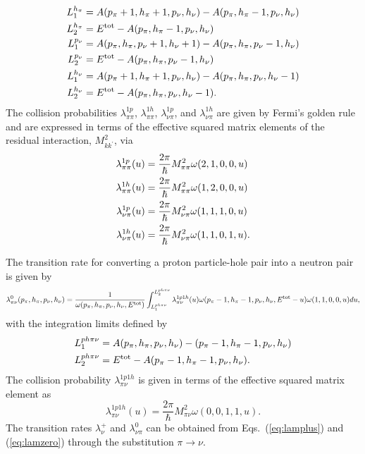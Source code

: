 \documentclass[
10pt,
showpacs,preprintnumbers,footinbib,
amsfonts,amsmath,amssymb,
aps,
prc,twocolumn,groupedaddress,superscriptaddress,
showkeys,
nofootinbib
]{revtex4-1}
\begin{document}
\begin{widetext}
\begin{align}
L_1^{h_\pi} & = A(p_\pi+1, h_\pi+1, p_\nu, h_\nu) - A(p_\pi, h_\pi-1, p_\nu, h_\nu) \notag \\
L_2^{h_\pi} & = E^{\rm tot}  - A(p_\pi, h_\pi-1, p_\nu, h_\nu) \notag \\
L_1^{p_\nu} & = A(p_\pi, h_\pi, p_\nu+1, h_\nu+1) - A(p_\pi, h_\pi, p_\nu-1, h_\nu) \notag \\
L_2^{p_\nu} & = E^{\rm tot}  - A(p_\pi, h_\pi, p_\nu-1, h_\nu) \notag\\
L_1^{h_\nu} & = A(p_\pi+1, h_\pi+1, p_\nu, h_\nu) - A(p_\pi, h_\pi, p_\nu, h_\nu-1) \notag \\
L_2^{h_\nu} & = E^{\rm tot}  - A(p_\pi, h_\pi, p_\nu, h_\nu-1).
\end{align}
The collision probabilities $\lambda_{\pi\pi}^{1p}$, $\lambda_{\pi\pi}^{1h}$, $\lambda_{\nu\pi}^{1p}$, and $\lambda_{\nu\pi}^{1h}$ are given by Fermi's golden rule and are expressed in terms of
the effective squared matrix elements of the residual interaction, $M_{kk^\prime}^2$, via
\begin{align}
\lambda_{\pi\pi}^{1p}(u) & = \frac{2\pi}{\hbar} M_{\pi\pi}^2\omega(2,1,0,0,u) \notag\\
\lambda_{\pi\pi}^{1h}(u) & = \frac{2\pi}{\hbar} M_{\pi\pi}^2\omega(1,2,0,0,u) \notag\\
\lambda_{\nu\pi}^{1p}(u) & = \frac{2\pi}{\hbar} M_{\nu\pi}^2\omega(1,1,1,0,u) \notag\\
\lambda_{\nu\pi}^{1h}(u) & = \frac{2\pi}{\hbar} M_{\nu\pi}^2\omega(1,1,0,1,u).
\end{align}

The transition rate for converting a proton particle-hole pair into a neutron pair is given by 
\begin{equation}
\lambda^0_{\pi\nu}(p_\pi, h_\pi, p_\nu, h_\nu) = \frac{1}{\omega(p_\pi, h_\pi, p_\nu, h_\nu,E^{\rm tot})} \int_{L_1^{ph\pi\nu}}^{L_2^{ph\pi\nu}}
                  \lambda_{\pi\nu}^{1p1h}(u)\omega(p_\pi-1, h_\pi-1, p_\nu, h_\nu,E^{\rm tot}-u)\omega(1,1,0,0,u)du,
\label{eq:lamzero}
\end{equation}
with the integration limits defined by
\begin{align}
L_1^{ph\pi\nu} & = A(p_\pi, h_\pi, p_\nu, h_\nu) - (p_\pi-1, h_\pi-1, p_\nu, h_\nu) \notag \\
L_2^{ph\pi\nu} & = E^{\rm tot} - A(p_\pi-1, h_\pi-1, p_\nu, h_\nu).
\end{align}
The collision probability $\lambda_{\pi\nu}^{1p1h}$ is given in terms of the effective squared matrix element as
\begin{equation}
\lambda_{\pi\nu}^{1p1h}(u) = \frac{2\pi}{\hbar} M_{\pi\nu}^2\omega(0,0,1,1,u).
\end{equation}
The transition rates $\lambda_\nu^+$ and $\lambda_{\nu\pi}^0$ can be obtained from Eqs.~(\ref{eq:lamplus}) and (\ref{eq:lamzero}) through the substitution $\pi \rightarrow \nu$.


\end{widetext}
\end{document}
